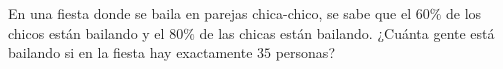 En una fiesta donde se baila en parejas chica-chico, se sabe que el $60\%$ de los chicos están bailando y el $80\%$ de las chicas están bailando. ¿Cuánta gente está bailando si en la fiesta hay exactamente $35$ personas?